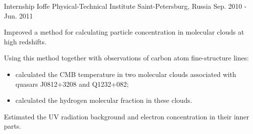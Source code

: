 \begin{cventries}
  \cventry
    {Internship} %
    {Ioffe Physical-Technical Institute} %
    {Saint-Petersburg, Russia} %
    {Sep. 2010 - Jun. 2011} %
    {
      \begin{cvitems} %
        \item {Improved a method for calculating particle concentration in molecular clouds at high redshifts.}
        \item {Using this method together with observations of carbon atom fine-structure lines:}
            \begin{itemize}
                \item {calculated the CMB temperature in two molecular clouds associated with quasars J0812+3208 and Q1232+082;}
                \item {calculated the hydrogen molecular fraction in these clouds.}
            \end{itemize}
        \item {Estimated the UV radiation background and electron concentration in their inner parts.}
      \end{cvitems}
    }

\end{cventries}
